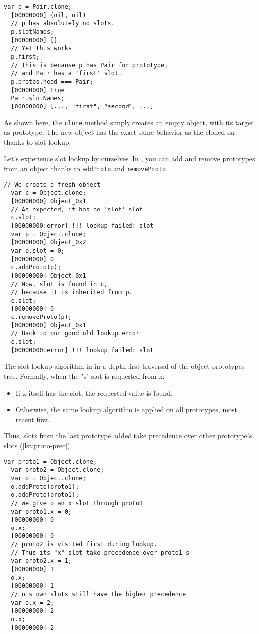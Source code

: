 \documentclass[openright,twoside,12pt]{report}
\begin{document}
\begin{lstlisting}[caption=Slot found by lookup, label=lst:simple-lookup]
  var p = Pair.clone;
  [00000000] (nil, nil)
  // p has absolutely no slots.
  p.slotNames;
  [00000000] []
  // Yet this works
  p.first;
  // This is because p has Pair for prototype,
  // and Pair has a 'first' slot.
  p.protos.head === Pair;
  [00000000] true
  Pair.slotNames;
  [00000000] [..., "first", "second", ...]
\end{lstlisting}

As shown here, the \texttt{clone} method simply creates an empty
object, with its target as prototype. The new object has the exact
same behavior as the cloned on thanks to slot lookup.

Let's experience slot lookup by ourselves. In \urbi, you can add and
remove prototypes from an object thanks to \texttt{addProto} and
\texttt{removeProto}.

\begin{lstlisting}[caption=Manipulating prototypes, label=lst:proto-change]
  // We create a fresh object
  var c = Object.clone;
  [00000000] Object_0x1
  // As expected, it has no 'slot' slot
  c.slot;
  [00000000:error] !!! lookup failed: slot
  var p = Object.clone;
  [00000000] Object_0x2
  var p.slot = 0;
  [00000000] 0
  c.addProto(p);
  [00000000] Object_0x1
  // Now, slot is found in c,
  // because it is inherited from p.
  c.slot;
  [00000000] 0
  c.removeProto(p);
  [00000000] Object_0x1
  // Back to our good old lookup error
  c.slot;
  [00000000:error] !!! lookup failed: slot
\end{lstlisting}

The slot lookup algorithm in \urbi in a depth-first traversal of the
object prototypes tree. Formally, when the "s" slot is requested from
x:

\begin{itemize}
\item If x itself has the slot, the requested value is found.
\item Otherwise, the same lookup algorithm is applied on all
  prototypes, most recent first.
\end{itemize}

Thus, slots from the last prototype added take precedence over other
prototype's slots (\autoref{lst:proto-prec}).

\begin{lstlisting}[caption=Prototype precedence, label=lst:proto-prec]
  var proto1 = Object.clone;
  var proto2 = Object.clone;
  var o = Object.clone;
  o.addProto(proto1);
  o.addProto(proto1);
  // We give o an x slot through proto1
  var proto1.x = 0;
  [00000000] 0
  o.x;
  [00000000] 0
  // proto2 is visited first during lookup.
  // Thus its "x" slot take precedence over proto1's
  var proto2.x = 1;
  [00000000] 1
  o.x;
  [00000000] 1
  // o's own slots still have the higher precedence
  var o.x = 2;
  [00000000] 2
  o.x;
  [00000000] 2
\end{lstlisting}
\end{document}
